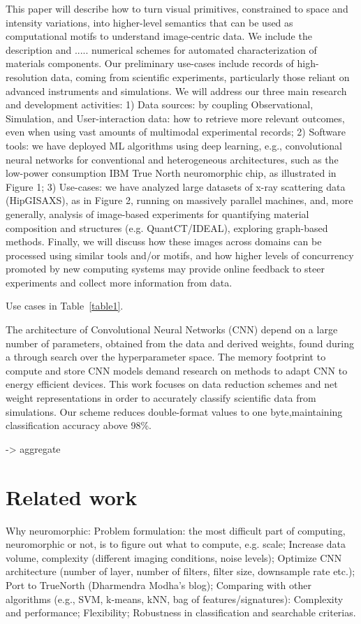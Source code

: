This paper will describe how to turn visual primitives, constrained to space and intensity variations, into higher-level semantics that can be used as computational motifs to understand image-centric data. We include the description and .....
 numerical schemes for automated characterization of materials components. Our preliminary use-cases include records of high-resolution data, coming from scientific experiments, particularly those reliant on advanced instruments and simulations. We will address our three main research and development activities:
1) Data sources: by coupling Observational, Simulation, and User-interaction data: how to retrieve
more relevant outcomes, even when using vast amounts of multimodal experimental records;
2) Software tools: we have deployed ML algorithms using deep learning, e.g., convolutional neural
networks for conventional and heterogeneous architectures, such as the low-power consumption IBM True
North neuromorphic chip, as illustrated in Figure 1;
3) Use-cases: we have analyzed large datasets of x-ray scattering data (HipGISAXS), as in Figure 2, running on massively parallel machines, and, more generally, analysis of image-based experiments for quantifying material composition and structures (e.g. QuantCT/IDEAL), exploring graph-based methods. Finally, we will discuss how these images across domains can be processed using similar tools and/or motifs, and how higher levels of concurrency promoted by new computing systems may provide online feedback to steer experiments and collect more information from data.

Use cases in Table~\ref{table1}.

The architecture of Convolutional Neural Networks (CNN) depend on a
large number of parameters, obtained from the data and derived weights,
found during a through search over the hyperparameter space. The
memory footprint to compute and store CNN models demand research
on methods to adapt CNN to energy efficient devices. This work focuses
on data reduction schemes and net weight representations in order to
accurately classify scientific data from simulations. Our scheme reduces
double-format values to one byte,maintaining classification accuracy
above 98\%.

-> aggregate



\section{Related work}
Why neuromorphic:
Problem formulation: the most difficult part of computing, neuromorphic or not, is to figure out what to compute, e.g. scale;
Increase data volume, complexity (different imaging conditions, noise levels);
Optimize CNN architecture (number of layer, number of filters, filter size, downsample rate etc.);
Port to TrueNorth (Dharmendra Modha’s blog);
Comparing with other algorithms (e.g., SVM, k-means, kNN, bag of features/signatures):
Complexity and performance;
Flexibility;
Robustness in classification and searchable criterias.
